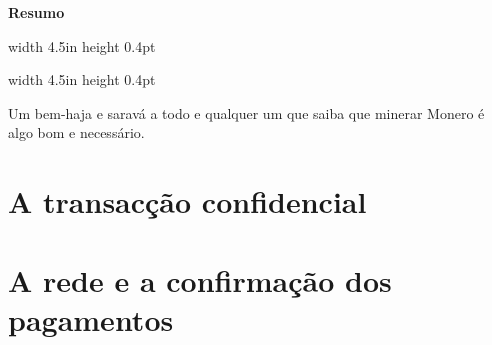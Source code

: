 \documentclass[letterpaper,12pt,english,oneside,onecolumn,final,openany]{report}
\begin{document}
\newpage
\pagestyle{empty}
\vspace{0.5cm}
\begin{center} 
\begin{minipage}{5.5in}
\begin{center}
\vspace*{\fill}%
{\LARGE \bfseries Resumo}
\end{center}
\begin{center} \vrule width 4.5in height 0.4pt \end{center} 
\parindent=0pt 

\begin{center} \vrule width 4.5in height 0.4pt \end{center}
\bigskip
{\small Um bem-haja e saravá a todo e qualquer um que saiba que minerar Monero é algo bom e necessário.\par}
\end{minipage} 
\vspace*{\fill}
\end{center}

\newpage
\pagestyle{plain}
\tableofcontents

%

\pagestyle{fancy}
\renewcommand{\chaptermark}[1]{\markboth{\thechapter\quad #1}{}}


\part{A transacção confidencial}







\part{A rede e a confirmação dos pagamentos}



\end{document}
